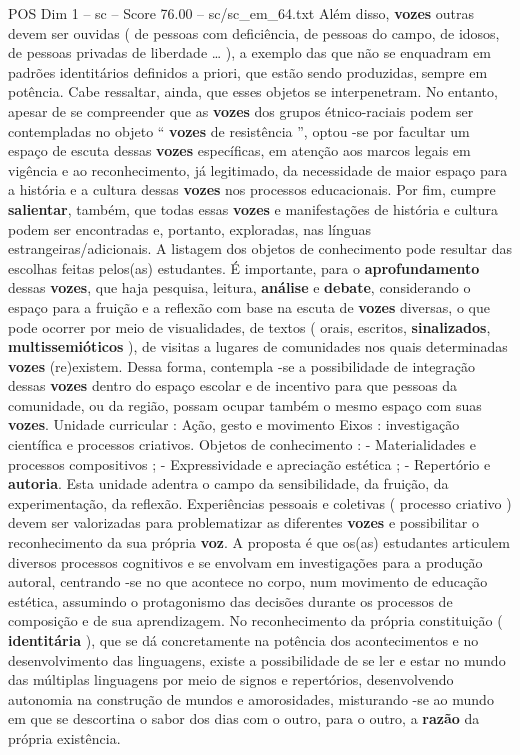 \begin{textsample}{POS Dim 1 – sc – Score 76.00 – sc/sc\_em\_64.txt}
Além disso, \textbf{vozes} outras devem ser ouvidas ( de pessoas com deficiência, de pessoas do campo, de idosos, de pessoas privadas de liberdade … ), a exemplo das que não se enquadram em padrões identitários definidos a priori, que estão sendo produzidas, sempre em potência.
Cabe ressaltar, ainda, que esses objetos se interpenetram.
No entanto, apesar de se compreender que as \textbf{vozes} dos grupos étnico-raciais podem ser contempladas no objeto “ \textbf{vozes} de resistência ”, optou -se por facultar um espaço de escuta dessas \textbf{vozes} específicas, em atenção aos marcos legais em vigência e ao reconhecimento, já legitimado, da necessidade de maior espaço para a história e a cultura dessas \textbf{vozes} nos processos educacionais.
Por fim, cumpre \textbf{salientar}, também, que todas essas \textbf{vozes} e manifestações de história e cultura podem ser encontradas e, portanto, exploradas, nas línguas estrangeiras/adicionais.
A listagem dos objetos de conhecimento pode resultar das escolhas feitas pelos(as) estudantes.
É importante, para o \textbf{aprofundamento} dessas \textbf{vozes}, que haja pesquisa, leitura, \textbf{análise} e \textbf{debate}, considerando o espaço para a fruição e a reflexão com base na escuta de \textbf{vozes} diversas, o que pode ocorrer por meio de visualidades, de textos ( orais, escritos, \textbf{sinalizados}, \textbf{multissemióticos} ), de visitas a lugares de comunidades nos quais determinadas \textbf{vozes} (re)existem.
Dessa forma, contempla -se a possibilidade de integração dessas \textbf{vozes} dentro do espaço escolar e de incentivo para que pessoas da comunidade, ou da região, possam ocupar também o mesmo espaço com suas \textbf{vozes}.
Unidade curricular : Ação, gesto e movimento Eixos : investigação científica e processos criativos.
Objetos de conhecimento : - Materialidades e processos compositivos ; - Expressividade e apreciação estética ; - Repertório e \textbf{autoria}.
Esta unidade adentra o campo da sensibilidade, da fruição, da experimentação, da reflexão.
Experiências pessoais e coletivas ( processo criativo ) devem ser valorizadas para problematizar as diferentes \textbf{vozes} e possibilitar o reconhecimento da sua própria \textbf{voz}.
A proposta é que os(as) estudantes articulem diversos processos cognitivos e se envolvam em investigações para a produção autoral, centrando -se no que acontece no corpo, num movimento de educação estética, assumindo o protagonismo das decisões durante os processos de composição e de sua aprendizagem.
No reconhecimento da própria constituição ( \textbf{identitária} ), que se dá concretamente na potência dos acontecimentos e no desenvolvimento das linguagens, existe a possibilidade de se ler e estar no mundo das múltiplas linguagens por meio de signos e repertórios, desenvolvendo autonomia na construção de mundos e amorosidades, misturando -se ao mundo em que se descortina o sabor dos dias com o outro, para o outro, a \textbf{razão} da própria existência.

\end{textsample}
